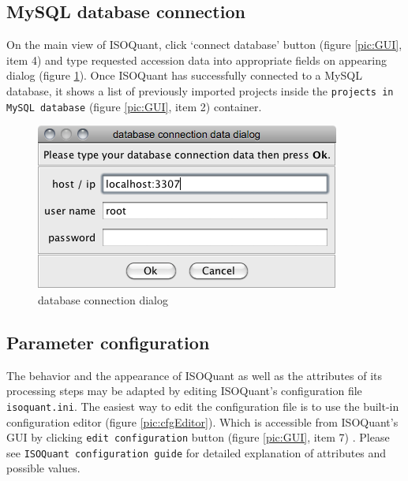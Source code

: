 \documentclass[]{article}
\makeatletter
\def\maxwidth{\ifdim\Gin@nat@width>\linewidth\linewidth
\else\Gin@nat@width\fi}
\let\Oldincludegraphics\includegraphics
\renewcommand{\includegraphics}[1]{\Oldincludegraphics[width=\maxwidth]{#1}}
\makeatother
\begin{document}
\subsection{MySQL database connection}

On the main view of ISOQuant, click `connect database' button (figure
\ref{pic:GUI}, item 4) and type requested accession data into
appropriate fields on appearing dialog (figure \ref{pic:dbDialog}). Once
ISOQuant has successfully connected to a MySQL database, it shows a list
of previously imported projects inside the
\lstinline!projects in MySQL database! (figure \ref{pic:GUI}, item 2)
container.

\begin{figure}[htbp]
\centering
\includegraphics{assets/isoquant/pics/db_dialog.png}
\caption{database connection dialog \label{pic:dbDialog}}
\end{figure}

\subsection{Parameter configuration}

The behavior and the appearance of ISOQuant as well as the attributes of
its processing steps may be adapted by editing ISOQuant's configuration
file \lstinline!isoquant.ini!. The easiest way to edit the configuration
file is to use the built-in configuration editor (figure
\ref{pic:cfgEditor}). Which is accessible from ISOQuant's GUI by
clicking \lstinline!edit configuration! button (figure \ref{pic:GUI},
item 7) . Please see \lstinline!ISOQuant configuration guide! for
detailed explanation of attributes and possible values.
\end{document}
